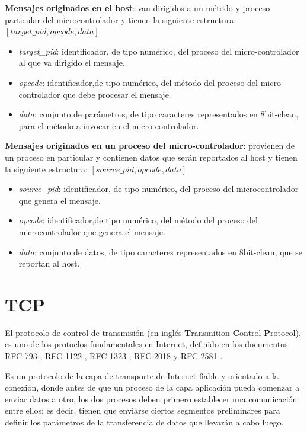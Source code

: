 \documentclass[withindex,glossary]{cam-thesis}
\begin{document}
\textbf{Mensajes originados en el host}: van dirigidos a un método y proceso particular del microcontrolador y tienen la siguiente estructura: $[ target\_pid, opcode, data]$
\begin{itemize}
	\item \textit{target\_pid}: identificador, de tipo numérico, del proceso del micro-controlador al que va dirigido el mensaje.
     \item \textit{opcode}: identificador,de tipo numérico, del método del proceso del micro-controlador que debe procesar el mensaje.
     \item \textit{data}: conjunto de parámetros, de tipo caracteres representados en 8bit-clean, para el método a invocar en el micro-controlador. 
\end{itemize}

\textbf{Mensajes originados en un proceso del micro-controlador}: provienen de un proceso en particular y contienen datos que serán reportados al host y tienen la siguiente estructura: $[ source\_pid, opcode, data]$
\begin{itemize}
	\item \textit{source\_pid}: identificador, de tipo numérico, del proceso del microcontrolador que genera el mensaje.
    \item \textit{opcode}: identificador,de tipo numérico, del método del proceso del microcontrolador que genera el mensaje.
	\item \textit{data}: conjunto de datos, de tipo caracteres representados en 8bit-clean, que se reportan al host. 
\end{itemize}
\section{TCP}
El protocolo de control de transmisión (en inglés \textbf{T}ransmition \textbf{C}ontrol \textbf{P}rotocol), es uno de los protoclos fundamentales en Internet, definido en los documentos RFC 793 \cite{TCPRFC793}, RFC 1122 \cite{TCPRFC1122}, RFC 1323 \cite{TCPRFC1323}, RFC 2018 \cite{TCPRFC2018} y RFC 2581 \cite{TCPRFC2581}. 

Es un protocolo de la capa de transporte de Internet fiable y orientado a la conexión, donde antes de que un proceso de la capa aplicación pueda comenzar a enviar datos a otro, los dos procesos deben primero establecer una comunicación entre ellos; es decir, tienen que enviarse ciertos segmentos preliminares para definir los parámetros de la transferencia de datos que llevarán a cabo luego.
\end{document}
